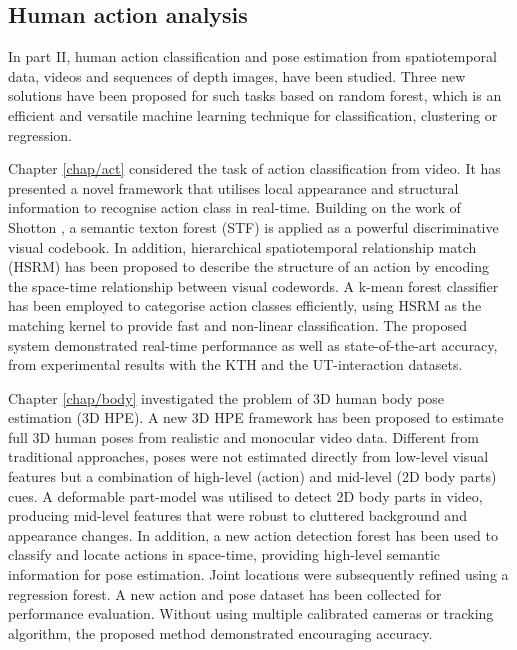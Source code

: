 \subsection{Human action analysis}

In part II, human action classification and pose estimation from spatiotemporal data, \eg videos and sequences of depth images, have been studied. Three new solutions have been proposed for such tasks based on random forest, which is an efficient and versatile machine learning technique for classification, clustering or regression. 

Chapter \ref{chap/act} considered the task of action classification from video. It has presented a novel framework that utilises local appearance and structural information to recognise action class in real-time. Building on the work of Shotton \etal \cite{Shotton2008}, a semantic texton forest (STF) is applied as a powerful discriminative visual codebook. In addition, hierarchical spatiotemporal relationship match (HSRM) has been proposed to describe the structure of an action by encoding the space-time relationship between visual codewords. A k-mean forest classifier has been employed to categorise action classes efficiently, using HSRM as the matching kernel to provide fast and non-linear classification. The proposed system demonstrated real-time performance as well as state-of-the-art accuracy, from experimental results with the KTH and the UT-interaction datasets. 

Chapter \ref{chap/body} investigated the problem of 3D human body pose estimation (3D HPE).
A new 3D HPE framework has been proposed to estimate full 3D human poses from realistic and monocular video data. Different from traditional approaches, poses were not estimated directly from low-level visual features but a combination of high-level (action) and mid-level (2D body parts) cues. 
A deformable part-model was utilised to detect 2D body parts in video, producing mid-level features that were robust to cluttered background and appearance changes. In addition, a new action detection forest has been used to classify and locate actions in space-time, providing high-level semantic information for pose estimation. Joint locations were subsequently refined using a regression forest. A new action and pose dataset has been collected for performance evaluation. Without using multiple calibrated cameras or tracking algorithm, the proposed method demonstrated encouraging accuracy.

